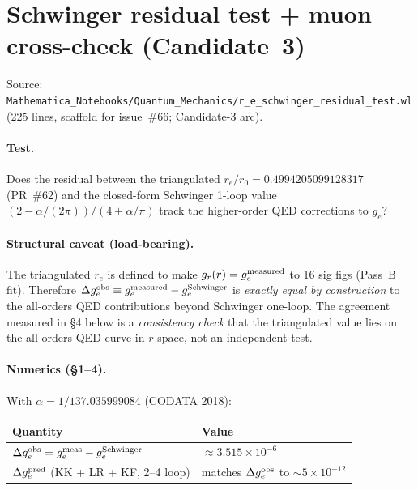 \section{Schwinger residual test + muon cross-check (Candidate~3)}
\label{sec:eq-schwinger-residual}

Source:
\texttt{Mathematica\_Notebooks/Quantum\_Mechanics/r\_e\_schwinger\_residual\_test.wl}
(225 lines, scaffold for issue~\#66; Candidate-3 arc).

\paragraph{Test.}
Does the residual between the triangulated $r_e/r_0 = 0.4994205099128317$
(PR~\#62) and the closed-form Schwinger 1-loop value
$(2 - \alpha/(2\pi))/(4 + \alpha/\pi)$ track the higher-order QED corrections
to $g_e$?

\paragraph{Structural caveat (load-bearing).}
The triangulated $r_e$ is defined to make $g_r(r) = g_e^{\rm measured}$ to 16
sig figs (Pass~B fit). Therefore
$\Delta g_e^{\rm obs} \equiv g_e^{\rm measured} - g_e^{\rm Schwinger}$ is
\emph{exactly equal by construction} to the all-orders QED contributions
beyond Schwinger one-loop. The agreement measured in \S4 below is a
\emph{consistency check} that the triangulated value lies on the all-orders
QED curve in $r$-space, not an independent test.

\paragraph{Numerics (\S1--4).}
With $\alpha = 1/137.035999084$ (CODATA 2018):
\begin{center}
\begin{tabular}{ll}
\toprule
Quantity                                            & Value \\
\midrule
$\Delta g_e^{\rm obs} = g_e^{\rm meas} - g_e^{\rm Schwinger}$ & $\approx 3.515\times 10^{-6}$ \\
$\Delta g_e^{\rm pred}$ (KK + LR + KF, 2--4 loop)   & matches $\Delta g_e^{\rm obs}$ to $\sim 5\times 10^{-12}$ \\
\bottomrule
\end{tabular}
\end{center}

